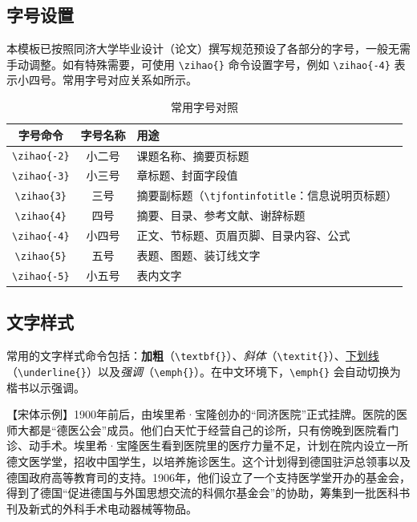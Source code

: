 \subsection{字号设置}

本模板已按照同济大学毕业设计（论文）撰写规范预设了各部分的字号，一般无需手动调整。如有特殊需要，可使用 \verb|\zihao{}| 命令设置字号，例如 \verb|\zihao{-4}| 表示小四号。常用字号对应关系如所示。

\begin{table}[htbp]
  \centering
  \caption{常用字号对照}\label{tab:font-sizes}
  \begin{tabular}{ccl}
    \toprule
    \textbf{字号命令} & \textbf{字号名称} & \textbf{用途} \\
    \midrule
    \texttt{\textbackslash zihao\{-2\}} & 小二号 & 课题名称、摘要页标题 \\
    \texttt{\textbackslash zihao\{-3\}} & 小三号 & 章标题、封面字段值 \\
    \texttt{\textbackslash zihao\{3\}}  & 三号   & 摘要副标题（\texttt{\textbackslash tjfontinfotitle}：信息说明页标题） \\
    \texttt{\textbackslash zihao\{4\}}  & 四号   & 摘要、目录、参考文献、谢辞标题 \\
    \texttt{\textbackslash zihao\{-4\}} & 小四号 & 正文、节标题、页眉页脚、目录内容、公式 \\
    \texttt{\textbackslash zihao\{5\}}  & 五号   & 表题、图题、装订线文字 \\
    \texttt{\textbackslash zihao\{-5\}} & 小五号 & 表内文字 \\
    \bottomrule
  \end{tabular}
\end{table}

\subsection{文字样式}

常用的文字样式命令包括：\textbf{加粗}（\verb|\textbf{}|）、\textit{斜体}（\verb|\textit{}|）、\underline{下划线}（\verb|\underline{}|）以及\emph{强调}（\verb|\emph{}|）。在中文环境下，\verb|\emph{}| 会自动切换为楷书以示强调。

{\songti

【宋体示例】1900年前后，由埃里希·宝隆创办的“同济医院”正式挂牌。医院的医师大都是“德医公会”成员。他们白天忙于经营自己的诊所，只有傍晚到医院看门诊、动手术。埃里希·宝隆医生看到医院里的医疗力量不足，计划在院内设立一所德文医学堂，招收中国学生，以培养施诊医生。这个计划得到德国驻沪总领事以及德国政府高等教育司的支持。1906年，他们设立了一个支持医学堂开办的基金会，得到了德国“促进德国与外国思想交流的科佩尔基金会”的协助，筹集到一批医科书刊及新式的外科手术电动器械等物品。}

